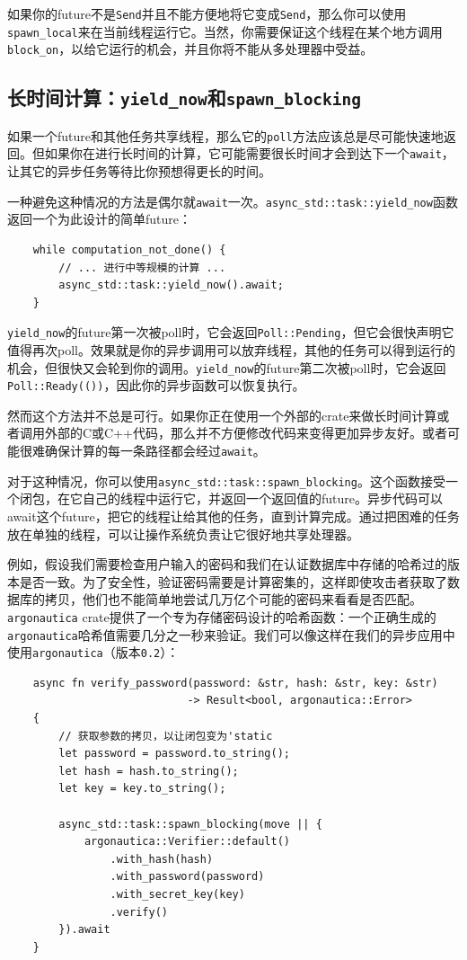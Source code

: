 如果你的future不是\texttt{Send}并且不能方便地将它变成\texttt{Send}，那么你可以使用\texttt{spawn\_local}来在当前线程运行它。当然，你需要保证这个线程在某个地方调用\texttt{block\_on}，以给它运行的机会，并且你将不能从多处理器中受益。

\subsection{长时间计算：\texttt{yield\_now}和\texttt{spawn\_blocking}}\label{LongCompute}

如果一个future和其他任务共享线程，那么它的\texttt{poll}方法应该总是尽可能快速地返回。但如果你在进行长时间的计算，它可能需要很长时间才会到达下一个\texttt{await}，让其它的异步任务等待比你预想得更长的时间。

一种避免这种情况的方法是偶尔就\texttt{await}一次。\texttt{async\_std::task::yield\_now}函数返回一个为此设计的简单future：
\begin{verbatim}
    while computation_not_done() {
        // ... 进行中等规模的计算 ...
        async_std::task::yield_now().await;
    }
\end{verbatim}

\texttt{yield\_now}的future第一次被poll时，它会返回\texttt{Poll::Pending}，但它会很快声明它值得再次poll。效果就是你的异步调用可以放弃线程，其他的任务可以得到运行的机会，但很快又会轮到你的调用。\texttt{yield\_now}的future第二次被poll时，它会返回\texttt{Poll::Ready(())}，因此你的异步函数可以恢复执行。

然而这个方法并不总是可行。如果你正在使用一个外部的crate来做长时间计算或者调用外部的C或C++代码，那么并不方便修改代码来变得更加异步友好。或者可能很难确保计算的每一条路径都会经过\texttt{await}。

对于这种情况，你可以使用\texttt{async\_std::task::spawn\_blocking}。这个函数接受一个闭包，在它自己的线程中运行它，并返回一个返回值的future。异步代码可以await这个future，把它的线程让给其他的任务，直到计算完成。通过把困难的任务放在单独的线程，可以让操作系统负责让它很好地共享处理器。

例如，假设我们需要检查用户输入的密码和我们在认证数据库中存储的哈希过的版本是否一致。为了安全性，验证密码需要是计算密集的，这样即使攻击者获取了数据库的拷贝，他们也不能简单地尝试几万亿个可能的密码来看看是否匹配。\texttt{argonautica} crate提供了一个专为存储密码设计的哈希函数：一个正确生成的\texttt{argonautica}哈希值需要几分之一秒来验证。我们可以像这样在我们的异步应用中使用\texttt{argonautica}（版本\texttt{0.2}）：
\begin{verbatim}
    async fn verify_password(password: &str, hash: &str, key: &str)
                            -> Result<bool, argonautica::Error>
    {
        // 获取参数的拷贝，以让闭包变为'static
        let password = password.to_string();
        let hash = hash.to_string();
        let key = key.to_string();

        async_std::task::spawn_blocking(move || {
            argonautica::Verifier::default()
                .with_hash(hash)
                .with_password(password)
                .with_secret_key(key)
                .verify()
        }).await
    }
\end{verbatim}

